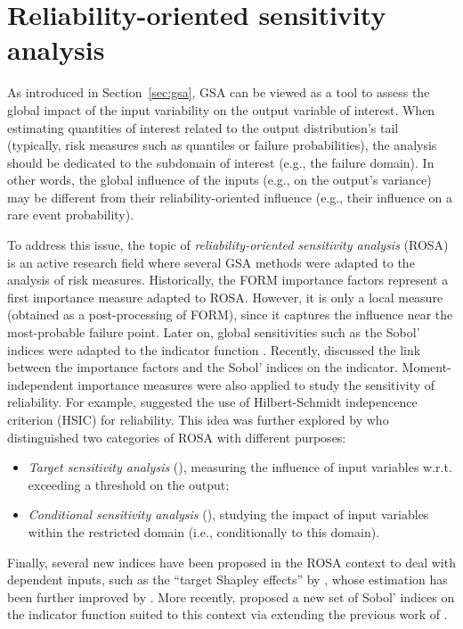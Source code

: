 \section{Reliability-oriented sensitivity analysis}\label{sec:bancs_rosa}


As introduced in Section~\ref{sec:gsa}, GSA can be viewed as a tool to assess the global impact of the input variability on the output variable of interest. 
When estimating quantities of interest related to the output distribution's tail (typically, risk measures such as quantiles or failure probabilities), the analysis should be dedicated to the subdomain of interest (e.g., the failure domain). 
In other words, the global influence of the inputs (e.g., on the output's variance) may be different from their reliability-oriented influence (e.g., their influence on a rare event probability). 

To address this issue, the topic of \textit{reliability-oriented sensitivity analysis} (ROSA) is an active research field where several GSA methods were adapted to the analysis of risk measures. 
Historically, the FORM importance factors represent a first importance measure adapted to ROSA. 
However, it is only a local measure (obtained as a post-processing of FORM), since it captures the influence near the most-probable failure point.  
Later on, global sensitivities such as the Sobol' indices were adapted to the indicator function \citep{wei_2012_rosa,chabridon_2018_thesis,perrin_2019_rosa}. 
Recently, \citet{papaioannou_2021_rosa_form} discussed the link between the importance factors and the Sobol' indices on the indicator. 
Moment-independent importance measures were also applied to study the sensitivity of reliability. 
For example, \citet{daveiga_2015} suggested the use of Hilbert-Schmidt indepencence criterion (HSIC) for reliability. 
This idea was further explored by \citet{marrel_chabridon_2021} who distinguished two categories of ROSA with different purposes: 
\begin{itemize}
    \item \textit{Target sensitivity analysis} (), measuring the influence of input variables w.r.t. exceeding a threshold on the output; 
    \item \textit{Conditional sensitivity analysis} (), studying the impact of input variables within the restricted domain (i.e., conditionally to this domain).
\end{itemize}
Finally, several new indices have been proposed in the ROSA context to deal with dependent inputs, such as the ``target Shapley effects'' by \citet{ilidrissi_2021_rosa}, whose estimation has been further improved by \citet{demange_2023_ijuq}. More recently, \citet{ehre_2024_vb_rosa} proposed a new set of Sobol' indices on the indicator function suited to this context via extending the previous work of \citet{mara_tarantola_2012}.

